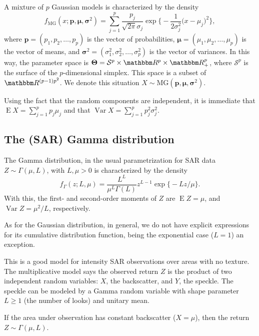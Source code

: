 A mixture of $p$ Gaussian models is characterized by the density
\begin{equation}
f_{\text{MG}}(x;\bm p,\bm \mu, \bm \sigma^2) = 
\sum_{j=1}^{p}
\frac{p_j}{\sqrt{2\pi}\sigma_j} \exp\Big\{
-\frac{1}{2\sigma_j^2} \big(x - \mu_j)^2 \Big\},
\label{eq:DensMixtureGaussian}
\end{equation}
where $\bm p=(p_1,p_2, \dots, p_p)$ is the vector of probabilities,
$\bm \mu = (\mu_1, \mu_2,\dots, \mu_p)$ is the vector of means,
and
$\bm \sigma^2 = (\sigma^2_1, \sigma^2_2,\dots, \sigma^2_ p)$ is the vector of variances.
In this way, the parameter space is $\bm \Theta =
\mathcal S^p\times \mathbbm R^p \times \mathbbm R_+^p$, where
$\mathcal S^p$ is the surface of the $p$-dimensional simplex.
This space is a subset of $\mathbbm R^{(p-1)p^2}$. 
We denote this situation $X\sim \text{MG}(\bm p, \bm \mu, \bm \sigma^2)$.

Using the fact that the random components are independent, it is immediate that
$\operatorname{E}X = \sum_{j=1}^{p} p_j\mu_j$ and that
$\operatorname{Var}X = \sum_{j=1}^{p} p_j^2\sigma^2_j$.

\subsection{The (SAR) Gamma distribution}

The Gamma distribution, in the usual parametrization for SAR data $Z\sim\Gamma(\mu,L)$, with $L,\mu>0$ is characterized by the density
\begin{equation}
f_\Gamma(z;L,\mu) = \frac{L^L}{\mu^{L}\Gamma(L)} z^{L-1} 
	\exp\big\{ -L z / \mu
	\big\}.
\label{eq:SARGammaDensity}
\end{equation}
With this, the first- and second-order moments of $Z$ are
$\operatorname{E}Z=\mu$,
and 
$\operatorname{Var}Z=\mu^2/L$,
respectively.

As for the Gaussian distribution, in general, we do not have explicit expressions for its cumulative distribution function, being the exponential case ($L=1$) an exception.

This is a good model for intensity SAR observations over areas with no texture.
The multiplicative model says the observed return $Z$ is the product of two independent random variables:
$X$, the backscatter, and
$Y$, the speckle.
The speckle can be modeled by a Gamma random variable with shape parameter $L\geq1$ (the number of looks) and unitary mean.

If the area under observation has constant backscatter ($X=\mu$), then the return $Z\sim\Gamma(\mu,L)$.

